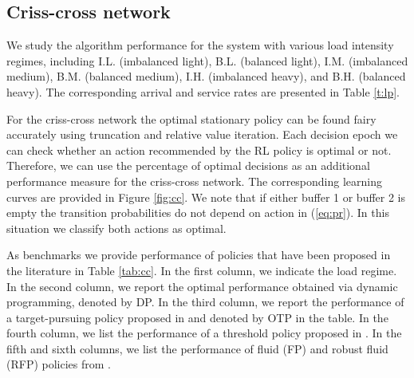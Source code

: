 \documentclass[11pt]{article}
\theoremstyle{definition}
\numberwithin{equation}{section}
\begin{document}
\subsection{Criss-cross network}

 We study the algorithm performance  for the system  with  various load intensity regimes, including    I.L. (imbalanced light), B.L. (balanced light), I.M. (imbalanced medium), B.M. (balanced medium), I.H. (imbalanced heavy), and B.H. (balanced heavy). The corresponding arrival and service rates are presented in Table \ref{t:lp}.



 For the criss-cross network the optimal stationary policy can be found fairy accurately using truncation and relative value iteration. Each decision epoch we can check whether an action recommended by the RL policy is optimal or not. Therefore, we can use the percentage of optimal decisions as an additional performance measure for the criss-cross network. The corresponding learning curves are provided in Figure \ref{fig:cc}. We note that if either buffer 1 or buffer 2 is empty the transition probabilities do not depend on action in (\ref{eq:pr}). In this situation we classify both actions as optimal.












As benchmarks we provide performance of policies that have been proposed in the literature in Table \ref{tab:cc}. In the first column, we indicate the load regime. In the second column, we report the optimal performance obtained via dynamic programming, denoted by DP.  %
In the third column,
we report the performance of a target-pursuing
policy proposed in \cite{Paschalidis2004} and denoted by OTP in the table. In the fourth column, we list the performance of a threshold policy proposed in \cite{Harrison1990}. %
 In the fifth and sixth columns,
we list the performance of fluid (FP) and robust fluid (RFP) policies from  \cite{Bertsimas2015}.
\end{document}
